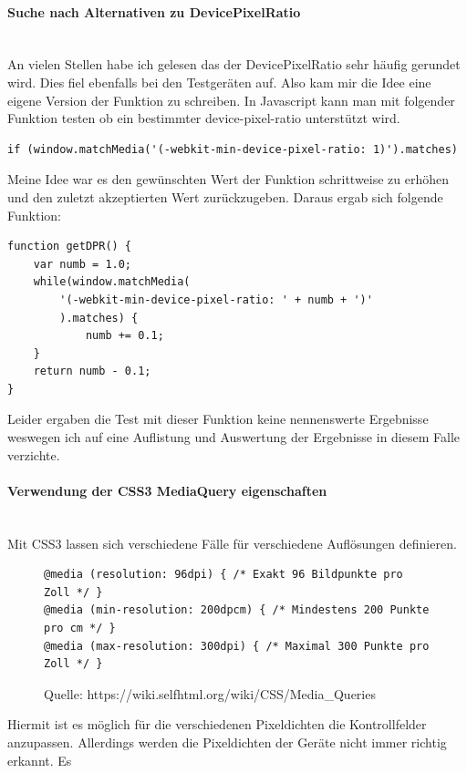 \paragraph{Suche nach Alternativen zu DevicePixelRatio}
\mbox{}\\
An vielen Stellen habe ich gelesen das der DevicePixelRatio sehr häufig gerundet wird. Dies fiel ebenfalls bei den Testgeräten auf.
\newline
Also kam mir die Idee eine eigene Version der Funktion zu schreiben. In Javascript kann man mit folgender Funktion testen ob ein bestimmter device-pixel-ratio unterstützt wird.
\begin{lstlisting}
if (window.matchMedia('(-webkit-min-device-pixel-ratio: 1)').matches) 
\end{lstlisting}
Meine Idee war es den gewünschten Wert der Funktion schrittweise zu erhöhen und den zuletzt akzeptierten Wert zurückzugeben.
\newline
Daraus ergab sich folgende Funktion:
\begin{lstlisting}
function getDPR() {
    var numb = 1.0;
    while(window.matchMedia(
    	'(-webkit-min-device-pixel-ratio: ' + numb + ')'
    	).matches) {
        	numb += 0.1;
    }
    return numb - 0.1;
}
\end{lstlisting}
Leider ergaben die Test mit dieser Funktion keine nennenswerte Ergebnisse weswegen ich auf eine Auflistung und Auswertung der Ergebnisse in diesem Falle verzichte.
\paragraph{Verwendung der CSS3 MediaQuery eigenschaften}
\mbox{}\\
Mit CSS3 lassen sich verschiedene Fälle für verschiedene Auflösungen definieren.
\begin{figure}[ht]
	\centering
	\begin{lstlisting}
@media (resolution: 96dpi) { /* Exakt 96 Bildpunkte pro Zoll */ }
@media (min-resolution: 200dpcm) { /* Mindestens 200 Punkte pro cm */ }
@media (max-resolution: 300dpi) { /* Maximal 300 Punkte pro Zoll */ }
	\end{lstlisting}
	\caption{Quelle: https://wiki.selfhtml.org/wiki/CSS/Media_Queries}
	\label{figx}
\end{figure}
\newline
Hiermit ist es möglich für die verschiedenen Pixeldichten die Kontrollfelder anzupassen. Allerdings werden die Pixeldichten der Geräte nicht immer richtig erkannt. Es 
\newpage
